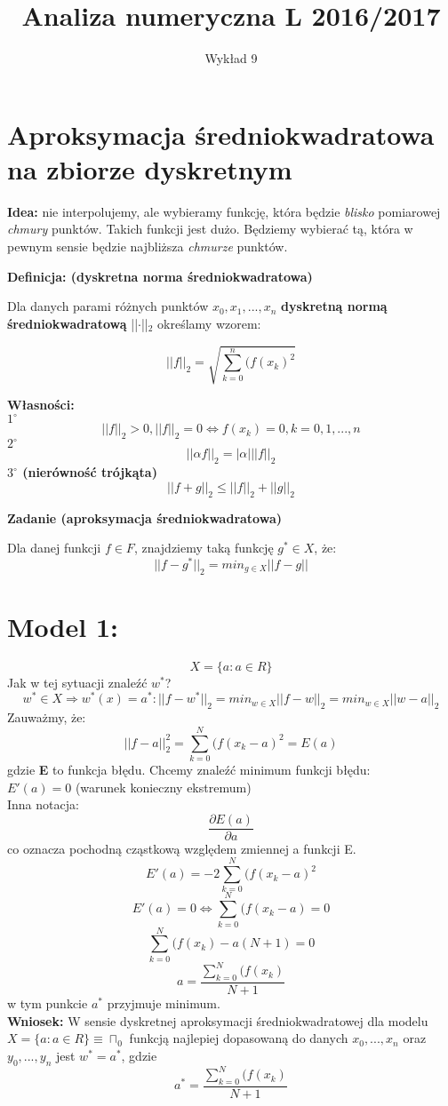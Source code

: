 \documentclass[12pt]{article}
\author{\LARGE Wykład 9}
\title{\bfseries\Huge Analiza numeryczna L 2016/2017}
\date{}
\begin{document}
\maketitle
\section*{Aproksymacja średniokwadratowa na zbiorze dyskretnym}
\vspace{5mm}
\large {\textbf{Idea:} nie interpolujemy, ale wybieramy funkcję, która będzie \textit{blisko} pomiarowej \textit{chmury} punktów. Takich funkcji jest dużo. Będziemy wybierać tą, która w pewnym sensie będzie najbliższa \textit{chmurze} punktów.}
\begin{center}
\vspace{5mm}
\textbf{Definicja: (dyskretna norma średniokwadratowa)}
\end{center}
Dla danych parami różnych punktów \(   x_0,x_1,...,x_n\) \textbf{dyskretną normą średniokwadratową} ||\(\cdot\)||\(_2\) określamy wzorem:
\begin{center}
$$||f||_2 = \sqrt{  \sum_{k=0}^{n} (f(x_k)^2 }$$
\end{center}
\textbf{Własności:}\\
\textbf{$1^{\circ}$ }
$$||f||_2>0,||f||_2 = 0 \Leftrightarrow f(x_k) = 0, k=0,1,...,n $$
\textbf{$2^{\circ}$ }
$$||\alpha f||_2 = |\alpha|||f||_2 $$
\textbf{$3^{\circ}$ (nierówność trójkąta)}
$$||f+g||_2 \le ||f||_2+||g||_2 $$
\newpage
\begin{center}
\textbf{Zadanie (aproksymacja średniokwadratowa)}
\end{center}
Dla danej funkcji $ f \in F$, znajdziemy taką funkcję $g^{*} \in X$, że: 
$$||f-g^{*}||_2 = min_{g \in X} ||f-g||$$
\section*{Model 1:}
$$ X = \{a: a \in R\}$$
Jak w tej sytuacji znaleźć $w^{*}$?\\
$$w^{*} \in X \Rightarrow w^{*}(x) = a^{*}: ||f-w^{*}||_2=min_{w \in X} ||f-w||_2 = min_{w \in X}||w-a||_2 $$
Zauważmy, że:
$$||f-a||^{2}_2 = \sum_{k=0}^{N} (f(x_k-a)^2= E(a)  $$
gdzie \textbf{E} to funkcja błędu.
Chcemy znaleźć minimum funkcji błędu:\\
$E'(a) =0$ (warunek konieczny ekstremum)\\
Inna notacja:
$$\frac{\partial E(a)}{\partial a}$$
co oznacza pochodną cząstkową względem zmiennej a funkcji E.
$$E'(a) = -2 \sum_{k=0}^{N} (f(x_k-a)^2$$
$$E'(a) = 0 \Leftrightarrow  \sum_{k=0}^{N} (f(x_k-a) =0  $$
$$ \sum_{k=0}^{N} (f(x_k)-a(N+1) =0$$
$$ a = \frac{\sum_{k=0}^{N} (f(x_k)}{N+1}$$
w tym punkcie $a^{*}$ przyjmuje minimum.\\
\textbf{Wniosek:} W sensie dyskretnej aproksymacji średniokwadratowej dla modelu $X= \{a:a \in R\} \equiv \sqcap_0$ funkcją najlepiej dopasowaną do danych $x_0,...,x_n$ oraz $y_0,...,y_n$ jest $w^{*} = a^{*}$, gdzie 
$$ a^{*} = \frac{\sum_{k=0}^{N} (f(x_k)}{N+1}$$
\end{document}
